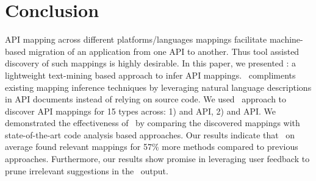 \section{Conclusion}
\label{sec:conclusion}



API mapping across different platforms/languages mappings facilitate machine-based migration
of an application from one API to another.
Thus tool assisted discovery of such mappings is highly desirable.
In this paper, we presented \tool : a lightweight text-mining based approach
to infer API mappings.
\tool\ compliments existing mapping inference techniques by leveraging natural language descriptions in API documents instead of relying on source code.
We used \tool\ approach to discover API mappings for 15 types across: 
1)  and  API,
2)  and  API.
We demonstrated the effectiveness of \tool\ by 
comparing the discovered mappings with state-of-the-art code analysis based approaches.
Our results indicate that \tool\ on average found relevant mappings for 57\% more methods compared to previous approaches. 
Furthermore, our results show promise in leveraging user feedback to prune irrelevant suggestions in the \tool\ output.